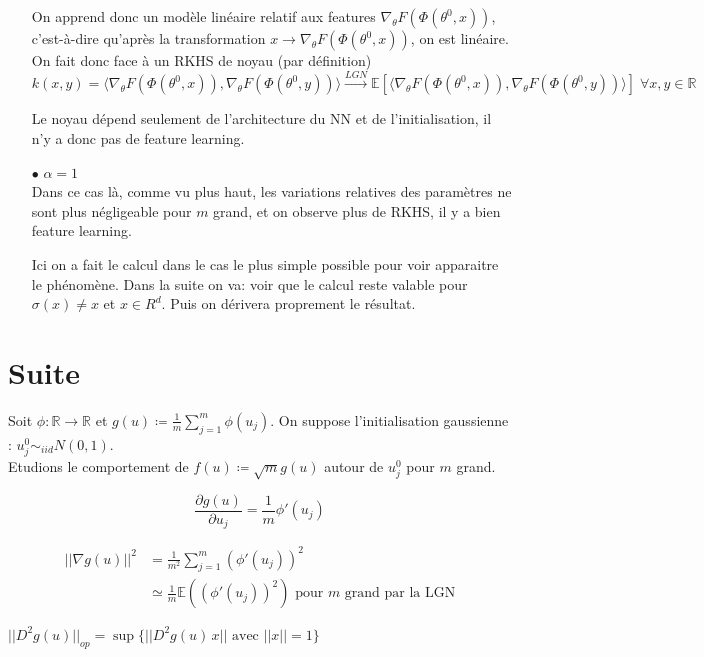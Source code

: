 \documentclass[a4paper, 11pt, french]{article}
\theoremstyle{definition}
\begin{document}
\begin{itemize}
	On apprend donc un modèle linéaire relatif aux features $\nabla_{\theta} F(\Phi(\theta^0, x))$, c'est-à-dire qu'après la transformation $x \rightarrow \nabla_{\theta} F(\Phi(\theta^0, x))$, on est linéaire. On fait donc face à un RKHS de noyau (par définition) $$k(x,y)=\langle\nabla_{\theta} F(\Phi(\theta^0, x)),\nabla_{\theta} F(\Phi(\theta^0, y))\rangle \stackrel{LGN}{\longrightarrow} \mathbb{E}[\langle\nabla_{\theta} F(\Phi(\theta^0, x)),\nabla_{\theta} F(\Phi(\theta^0, y))\rangle] \; \forall x,y \in \mathbb{R}$$
	
	Le noyau dépend seulement de l'architecture du NN et de l'initialisation, il n'y a donc pas de feature learning. \\
	
	\item[$\bullet$] $\alpha = 1$ \\

	Dans ce cas là, comme vu plus haut, les variations relatives des paramètres ne sont plus négligeable pour $m$ grand, et on observe plus de RKHS, il y a bien feature learning.
	
	
	Ici on a fait le calcul dans le cas le plus simple possible pour voir apparaitre le ph\'enom\`ene. Dans la suite on va: voir que le calcul reste valable pour $\sigma(x)\neq x$ et $x\in R^d$. Puis on d\'erivera proprement le r\'esultat. 
		
	\end{itemize}

	\section{Suite}
	
	Soit $\phi : \mathbb{R} \to \mathbb{R}$ et $g(u) \coloneqq \frac{1}{m} \sum_{j=1}^{m} \phi(u_j)$. On suppose l'initialisation gaussienne : $u_j^0 \sim_{iid} N(0,1)$.\\
	Etudions le comportement de $f(u) \coloneqq \sqrt{m} g(u)$ autour de $u_j^0$ pour $m$ grand.
	
	\[\frac{\partial g(u)}{\partial u_j} = \frac{1}{m} \phi '(u_j)\]
	
	\begin{align}
		||\nabla g(u) ||^2 &= \frac{1}{m^2} \sum_{j=1}^{m} (\phi '(u_j))^2 \\
		&\simeq \frac{1}{m} \mathbb{E}((\phi '(u_j))^2) \text{ pour $m$ grand par la LGN}
	\end{align}

	$||D^2 g(u)||_{op} = \sup \{||D^2 g(u) \, x|| \text{ avec } ||x|| = 1\}$
	
\end{document}
